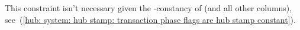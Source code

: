 This constraint isn't necessary given the \hubStamp-constancy of \txExec{} (and all other  columns),
see~(\ref{hub: system: hub stamp: transaction phase flags are hub stamp constant}).
